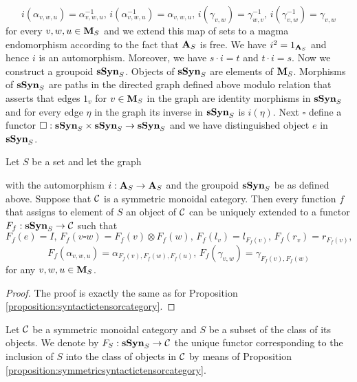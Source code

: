 $$i(\alpha_{v,w,u})=\alpha^{-1}_{v,w,u},\,i(\alpha^{-1}_{v,w,u})=\alpha_{v,w,u},\,i(\gamma_{v,w})=\gamma^{-1}_{w,v},\,i(\gamma^{-1}_{v,w})=\gamma_{v,w}$$
for every $v,w,u\in \mathbf{M}_S$ and we extend this map of sets to a magma endomorphism according to the fact that $\mathbf{A}_S$ is free. We have $i^2 = 1_{\mathbf{A}_S}$ and hence $i$ is an automorphism. Moreover, we have $s\cdot i = t$ and $t\cdot i= s$. Now we construct a groupoid $\mathbf{sSyn}_S$. Objects of $\mathbf{sSyn}_S$ are elements of $\mathbf{M}_S$. Morphisms of $\mathbf{sSyn}_S$ are paths in the directed graph defined above modulo relation that asserts that edges $1_v$ for $v\in \mathbf{M}_S$ in the graph are identity morphisms in $\mathbf{sSyn}_S$ and for every edge $\eta$ in the graph its inverse in $\mathbf{sSyn}_S$ is $i(\eta)$. Next $\square$ define a functor $\square:\mathbf{sSyn}_S\times \mathbf{sSyn}_S \rightarrow \mathbf{sSyn}_S$ and we have distinguished object $e$ in $\mathbf{sSyn}_S$.

\begin{proposition}\label{proposition:symmetricsyntactictensorcategory}
Let $S$ be a set and let the graph
\begin{center}
\end{center}
with the automorphism $i:\mathbf{A}_S\rightarrow \mathbf{A}_S$ and the groupoid  $\mathbf{sSyn}_{S}$ be as defined above. Suppose that ${\mathcal C}$ is a symmetric monoidal category. Then every function $f$ that assigns to element of $S$ an object of ${\mathcal C}$ can be uniquely extended to a functor $F_f:\mathbf{sSyn}_{S} \rightarrow {\mathcal C}$ such that 
$$F_f(e) = I,\,F_f(v\square w) = F_f(v)\otimes F_f(w),\,F_f(l_v) = l_{F_f(v)},\,F_f(r_v) = r_{F_f(v)},$$
$$F_f(\alpha_{v,w,u}) = \alpha_{F_f(v),F_f(w),F_f(u)},\,F_f(\gamma_{v,w})=\gamma_{F_f(v),F_f(w)}$$
for any $v,w,u\in \mathbf{M}_S$.
\end{proposition}
\begin{proof}
The proof is exactly the same as for Proposition \ref{proposition:syntactictensorcategory}.
\end{proof}
\noindent
Let ${\mathcal C}$ be a symmetric monoidal category and $S$ be a subset of the class of its objects. We denote by $F_S:\mathbf{sSyn}_S\rightarrow {\mathcal C}$ the unique functor corresponding to the inclusion of $S$ into the class of objects in ${\mathcal C}$ by means of Proposition \ref{proposition:symmetricsyntactictensorcategory}.

